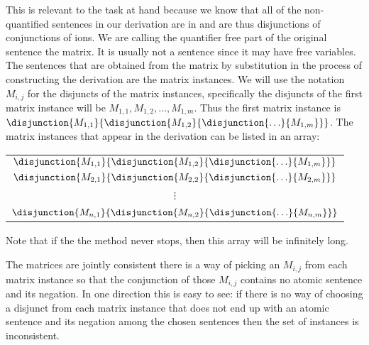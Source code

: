 This is relevant to the task at hand because we know that all of the non-quantified sentences in our derivation are in  and are thus disjunctions of conjunctions of ions.
We are calling the quantifier free part of the original sentence the matrix.
It is usually not a sentence since it may have free variables. 
The sentences that are obtained from the matrix by substitution in the process of constructing the derivation are the matrix instances. 
We will use the notation $M_{i,j}$ for the disjuncts of the matrix instances, specifically the disjuncts of the first matrix instance will be $M_{1,1},M_{1,2},\ldots,M_{1,m}$.
Thus the first matrix instance is $\disjunction{M_{1,1}}{\disjunction{M_{1,2}}{\disjunction{\ldots}{M_{1,m}}}}$.
The matrix instances that appear in the derivation can be listed in an array:
\begin{center}
\begin{tabular}{ c }
$\disjunction{M_{1,1}}{\disjunction{M_{1,2}}{\disjunction{\ldots}{M_{1,m}}}}$ \\
$\disjunction{M_{2,1}}{\disjunction{M_{2,2}}{\disjunction{\ldots}{M_{2,m}}}}$ \\
\\
\hspace{.5in} $\vdots$ \\
\\
$\disjunction{M_{n,1}}{\disjunction{M_{n,2}}{\disjunction{\ldots}{M_{n,m}}}}$ \\
\end{tabular}
\end{center}
Note that if the the method never stops, then this array will be infinitely long. 

The matrices are jointly consistent \Iff there is a way of picking an $M_{i,j}$ from each matrix instance so that the conjunction of those $M_{i,j}$ contains no atomic sentence and its negation. 
In one direction this is easy to see: if there is no way of choosing a disjunct from each matrix instance that does not end up with an atomic sentence and its negation among the chosen sentences then the set of instances is inconsistent. 

